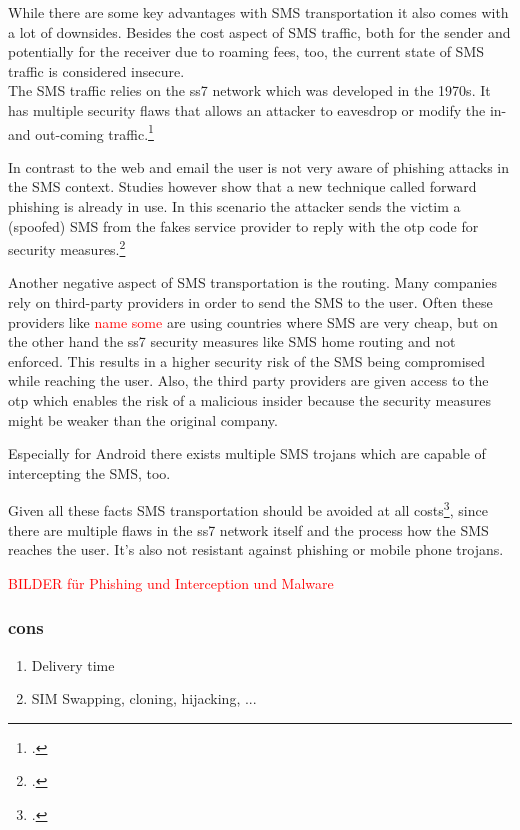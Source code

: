 While there are some key advantages with SMS transportation it also comes with a lot of downsides. Besides the cost aspect of SMS traffic, both for the sender and potentially for the receiver due to roaming fees, too, the current state of SMS traffic is considered insecure.\\
The SMS traffic relies on the \gls{ss7} network which was developed in the 1970s. It has multiple security flaws that allows an attacker to eavesdrop or modify the in- and out-coming traffic.\footcite{WELCH201717,7997246,puzankov2017stealthy}

In contrast to the web and email the user is not very aware of phishing attacks in the SMS context. Studies however show that a new technique called forward phishing is already in use. In this scenario the attacker sends the victim a (spoofed) SMS from the fakes service provider to reply with the \gls{otp} code for security measures.\footcite{JAKOBSSON20186,SIADATI201714}

Another negative aspect of SMS transportation is the routing. Many companies rely on third-party providers in order to send the SMS to the user. Often these providers like \textcolor{red}{name some} are using countries where SMS are very cheap, but on the other hand the \gls{ss7} security measures like SMS home routing and not enforced. This results in a higher security risk of the SMS being compromised while reaching the user. Also, the third party providers are given access to the \gls{otp} which enables the risk of a malicious insider because the security measures might be weaker than the original company.

Especially for Android there exists multiple SMS trojans which are capable of intercepting the SMS, too.

Given all these facts SMS transportation should be avoided at all costs\footcite{JAKOBSSON20186}, since there are multiple flaws in the \gls{ss7} network itself and the process how the SMS reaches the user. It's also not resistant against phishing or mobile phone trojans.


\textcolor{red}{BILDER für Phishing und Interception und Malware}

\subsubsection{cons}

\begin{enumerate}
	\item Delivery time
	\item SIM Swapping, cloning, hijacking, ...
\end{enumerate}

